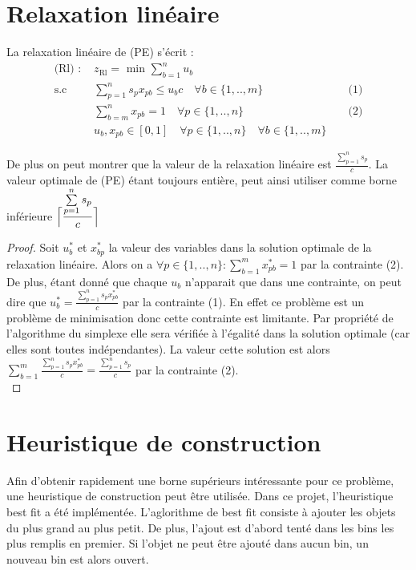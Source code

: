 \documentclass{article}
\begin{document}
\section{Relaxation linéaire}

La relaxation linéaire de (PE) s'écrit :\\


\begin{align*}
    \text{(Rl) : } &z_{\text{Rl}} = \text{ min } \sum \limits_{b = 1 }^{n} u_b\\
     \text{s.c } &\sum \limits_{p = 1}^{n} s_p x_{pb} \leqslant u_b c \quad \forall b \in \{ 1 , .., m \} &&\text{ (1)}\\
     &\sum \limits_{b = m}^{n} x_{pb} = 1 \quad \forall p \in \{ 1 , .., n \} &&\text{ (2)} \\
     &u_b , x_{pb} \in [0,1] \quad \forall p \in \{ 1 , .., n \} \quad \forall b \in \{ 1 , .., m \}
\end{align*}

De plus on peut montrer que la valeur de la relaxation linéaire est $\frac{\sum \limits_{p = 1}^n s_p}{c}$. La valeur  optimale de (PE) étant toujours entière, peut ainsi utiliser comme borne inférieure $\Bigl\lceil\dfrac{\sum \limits_{p = 1}^n s_p}{c}\Bigr\rceil\qquad$

\begin{proof}
Soit $u^*_b$ et $x^*_{bp}$ la valeur des variables dans la solution optimale de la relaxation linéaire. Alors on a $\forall p \in \{ 1 , .., n \} : \sum \limits_{b = 1}^{m} x^*_{pb} = 1$ par la contrainte (2). De plus, étant donné que chaque $u_b$ n’apparait que dans une contrainte, on peut dire que $u^*_b = \frac{\sum \limits_{p=1}^n s_p x^*_{pb}}{c}$ par la contrainte (1). En effet ce problème est un problème de minimisation donc cette contrainte est limitante. Par propriété de l'algorithme du simplexe elle sera vérifiée à l'égalité dans la solution optimale (car elles sont toutes indépendantes). La valeur cette solution est alors $\sum \limits_{b = 1}^m  \frac{\sum \limits_{p=1}^n s_p x^*_{pb}}{c} = \frac{\sum \limits_{p = 1}^n s_p}{c}$ par la contrainte (2).\\
\end{proof}

\section{Heuristique de construction}

Afin d'obtenir rapidement une borne supérieurs intéressante pour ce problème, une heuristique de construction peut être utilisée.
Dans ce projet, l'heuristique best fit a été implémentée.
L'aglorithme de best fit consiste à ajouter les objets du plus grand au plus petit. De plus, l'ajout est d'abord tenté dans les bins les plus remplis en premier. Si l'objet ne peut être ajouté dans aucun bin, un nouveau bin est alors ouvert.
\end{document}
